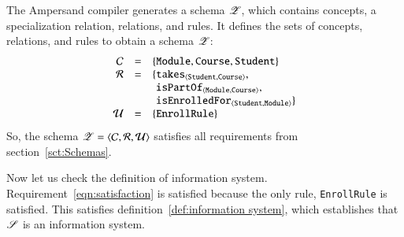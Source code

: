 \documentclass{elsarticle}
\begin{document}
   The Ampersand compiler generates a schema $\mathscr{Z}$, which contains concepts, a specialization relation, relations, and rules.
   It defines the sets of concepts, relations, and rules to obtain a schema $\mathscr{Z}$:
\[\begin{array}{rcl}
   \concepts&=&\{ {\tt Module}, {\tt Course}, {\tt Student}\}\\
   \rels&=&\{\begin{array}[t]{@{}l@{}}
               \declare{\tt takes}{\tt Student}{\tt Course},\\
               \declare{\tt isPartOf}{\tt Module}{\tt Course},\\
               \declare{\tt isEnrolledFor}{\tt Student}{\tt Module}\}
             \end{array}\\
   \rules&=&\{ {\tt EnrollRule}\}
  \end{array}
\]
   So, the schema $\mathscr{Z}=\langle{\mathcal{C}},{\mathcal{R}},{\mathcal{U}}\rangle$ satisfies all requirements from section~\ref{sct:Schemas}.

   Now let us check the definition of information system.
   Requirement~\ref{eqn:satisfaction} is satisfied because the only rule, {\tt EnrollRule} is satisfied.
   This satisfies definition~\ref{def:information system}, which establishes that $\mathscr{S}$ is an information system.

\end{document}
